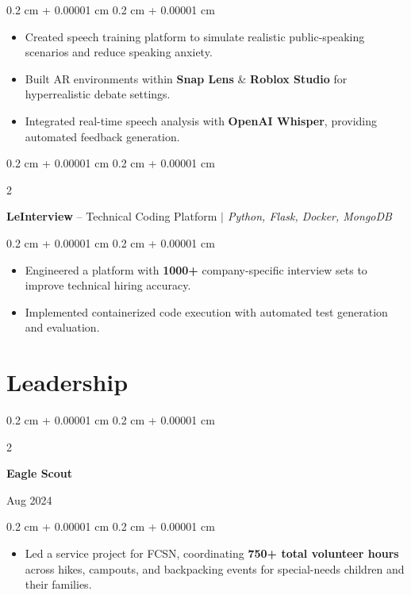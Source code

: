 \documentclass[10pt, letterpaper]{article}
\newenvironment{highlights}{
    \begin{itemize}[
        topsep=0.10 cm,
        parsep=0.10 cm,
        partopsep=0pt,
        itemsep=0pt,
        leftmargin=0.4 cm + 10pt
    ]
}{
    \end{itemize}
} %
\newenvironment{onecolentry}{
    \begin{adjustwidth}{
        0.2 cm + 0.00001 cm
    }{
        0.2 cm + 0.00001 cm
    }
}{
    \end{adjustwidth}
} %
\newenvironment{twocolentry}[2][]{
    \onecolentry
    \def\secondColumn{#2}
    \setcolumnwidth{\fill, 5 cm}
    \begin{paracol}{2}
}{
    \switchcolumn \raggedleft \secondColumn
    \end{paracol}
    \endonecolentry
} %
\let\hrefWithoutArrow\href
\renewcommand{\href}[2]{\hrefWithoutArrow{#1}{\ifthenelse{\equal{#2}{}}{ }{#2 }\raisebox{.15ex}{\footnotesize \faExternalLink*}}}
\begin{document}
        \vspace{0.10 cm}
        \begin{onecolentry}
            \begin{highlights}
                \item Created speech training platform to simulate realistic public-speaking scenarios and reduce speaking anxiety.
                \item Built AR environments within \textbf{Snap Lens} \& \textbf{Roblox Studio} for hyperrealistic debate settings.
                \item Integrated real-time speech analysis with \textbf{OpenAI Whisper}, providing automated feedback generation.
            \end{highlights}
        \end{onecolentry}


        \vspace{0.3 cm}

        \begin{twocolentry}{}
            \textbf{LeInterview} -- Technical Coding Platform \textit{ $|$ Python, Flask, Docker, MongoDB}
        \end{twocolentry}

        \vspace{0.10 cm}
        \begin{onecolentry}
            \begin{highlights}
                \item Engineered a platform with \textbf{1000+} company-specific interview sets to improve technical hiring accuracy.
                \item Implemented containerized code execution with automated test generation and evaluation.
            \end{highlights}
        \end{onecolentry}


    \section{Leadership}

        \begin{twocolentry}{
        Aug 2024}
            \textbf{Eagle Scout}
        \end{twocolentry}

        \vspace{0.10 cm}
        \begin{onecolentry}
            \begin{highlights}
                \item Led a service project for FCSN, coordinating \textbf{750+ total volunteer hours} across hikes, campouts, and backpacking events for special-needs children and their families.
            \end{highlights}
        \end{onecolentry}
\end{document}
